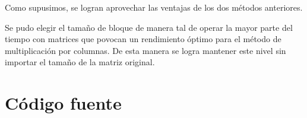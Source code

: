 \documentclass[a4paper,10pt]{article}
\begin{document}
Como supusimos, se logran aprovechar las ventajas de los dos métodos anteriores. 

Se pudo elegir el tamaño de bloque de manera tal de operar la mayor parte del tiempo con matrices que povocan un rendimiento óptimo para el método de multiplicación por columnas. De esta manera se logra mantener este nivel sin importar el tamaño de la matriz original.

\clearpage
\section{Código fuente}
\end{document}

